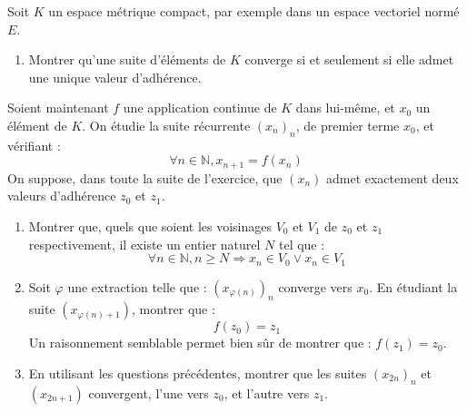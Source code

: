 \begin{exer}
Soit $K $ un espace m\'etrique compact, par exemple dans un espace vectoriel norm\'e $E$.
\begin{enumerate}
\item Montrer qu'une suite d'\'el\'ements de $K$ converge si et seulement si elle admet une unique valeur d'adh\'erence.
\end{enumerate}
\setcounter{stock}{\value{enumi}}
Soient maintenant $f$ une application continue de $K$ dans lui-m\^eme, et $x_0$ un \'el\'ement de $K$. %
On \'etudie la suite r\'ecurrente $(x_n)_n$, de premier terme $x_0$, et v\'erifiant : %
\[\forall n \in \mathbb{N} , x_{n+1} = f(x_n)\]
On suppose, dans toute la suite de l'exercice, que $(x_n)$ admet exactement deux valeurs d'adh\'erence $z_0$ et $z_1$.
\begin{enumerate}
\setcounter{enumi}{\value{stock}}
\item Montrer que, quels que soient les voisinages $V_0$ et $V_1$ de $z_0$ et $z_1$ respectivement, %
il existe un entier naturel $N$ tel que :
\[\forall n \in \mathbb{N} , n \geq N \Rightarrow x_n \in V_0 \vee x_n \in V_1\]
\item Soit $\varphi$ une extraction telle que : $(x_{\varphi(n)})_n$ converge vers $x_0$. %
En \'etudiant la suite $(x_{\varphi(n)+1})$, montrer que :
\[f(z_0)=z_1\]
Un raisonnement semblable permet bien sûr de montrer que : $f(z_1)=z_0$.
\item En utilisant les questions pr\'ec\'edentes, montrer que les suites $(x_{2n})_n$ et $(x_{2n+1})$ convergent, %
l'une vers $z_0$, et l'autre vers $z_1$.
\end{enumerate}
\end{exer}

